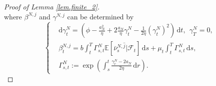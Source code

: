 \documentclass[10pt]{article}
\begin{document}
\begin{proof}[Proof of Lemma \ref{lem.finite_2}]
\[\]
where $\beta^{N,j}$ and $\gamma^{N,j}$ can be determined by
\begin{equation}
    \left\{
        \begin{aligned}
            &\mathrm{d} \gamma_t^N = \left( \phi - \frac{a_N^2}{\eta} + 2 \frac{a_N}{\eta} \gamma_t^N - \frac{1}{2\eta} (\gamma_t^N)^2  \right) \, \mathrm{d}t, ~~ \gamma_T^N = 0, \\
            & \beta_t^{N,j} = b \int_t^T \Gamma^N_{s,t} \mathbb{E}[\bar \nu^{N,\hat{j}}_s | \mathcal{F}_t] \, \mathrm{d}s + \mu_t \int_t^T \Gamma^N_{s,t} \, \mathrm{d}s, \\
            & \Gamma^N_{s,t} := \exp\left(\int_s^t \frac{\gamma_r^N - 2 a_N}{2\eta} \, \mathrm{d}r\right).
        \end{aligned}
    \right.
\end{equation}


\end{proof}
\end{document}
